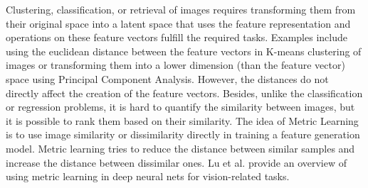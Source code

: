 Clustering, classification, or retrieval of images requires transforming them from their original space into a latent space that uses the feature representation and operations on these feature vectors fulfill the required tasks. Examples include using the euclidean distance between the feature vectors in K-means clustering of images or transforming them into a lower dimension (than the feature vector) space using Principal Component Analysis. However, the distances do not directly affect the creation of the feature vectors. Besides, unlike the classification or regression problems, it is hard to quantify the similarity between images, but it is possible to rank them based on their similarity. The idea of Metric Learning is to use image similarity or dissimilarity directly in training a feature generation model. Metric learning tries to reduce the distance between similar samples and increase the distance between dissimilar ones. Lu et al. \cite{Lu2017DeepML} provide an overview of using metric learning in deep neural nets for vision-related tasks.


